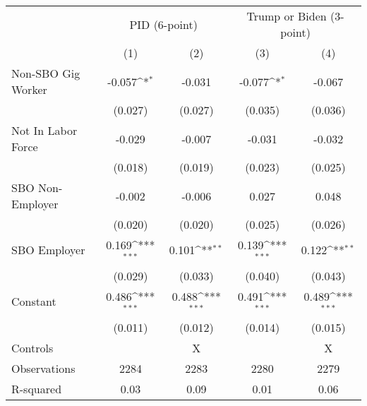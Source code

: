 {
\def\sym#1{\ifmmode^{#1}\else\(^{#1}\)\fi}
\begin{tabular}{l*{4}{c}}
\hline\hline
                    &\multicolumn{2}{c}{PID (6-point)}          &\multicolumn{2}{c}{Trump or Biden (3-point)}\\
                    &\multicolumn{1}{c}{(1)}         &\multicolumn{1}{c}{(2)}         &\multicolumn{1}{c}{(3)}         &\multicolumn{1}{c}{(4)}         \\
\hline
Non-SBO Gig Worker  &      -0.057\sym{*}  &      -0.031         &      -0.077\sym{*}  &      -0.067         \\
                    &     (0.027)         &     (0.027)         &     (0.035)         &     (0.036)         \\
Not In Labor Force  &      -0.029         &      -0.007         &      -0.031         &      -0.032         \\
                    &     (0.018)         &     (0.019)         &     (0.023)         &     (0.025)         \\
SBO Non-Employer    &      -0.002         &      -0.006         &       0.027         &       0.048         \\
                    &     (0.020)         &     (0.020)         &     (0.025)         &     (0.026)         \\
SBO Employer        &       0.169\sym{***}&       0.101\sym{**} &       0.139\sym{***}&       0.122\sym{**} \\
                    &     (0.029)         &     (0.033)         &     (0.040)         &     (0.043)         \\
Constant            &       0.486\sym{***}&       0.488\sym{***}&       0.491\sym{***}&       0.489\sym{***}\\
                    &     (0.011)         &     (0.012)         &     (0.014)         &     (0.015)         \\
\hline
Controls            &                     &           X         &                     &           X         \\
Observations        &        2284         &        2283         &        2280         &        2279         \\
R-squared           &        0.03         &        0.09         &        0.01         &        0.06         \\
\hline\hline
\end{tabular}
}
